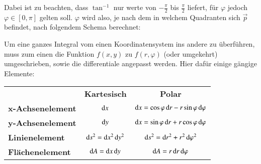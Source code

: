 Dabei ist zu beachten, dass $\tan^{-1}$ nur werte von $-\frac{\pi}{2}$ bis $\frac{\pi}{2}$ liefert, für $\varphi$ jedoch $\varphi \in [0, \pi]$ gelten soll. 
$\varphi$ wird also, je nach dem in welchem Quadranten sich $\vec{p}$ befindet, nach folgendem Schema berechnet:
\begin{center}
\end{center}

Um eine ganzes Integral vom einen Koordinatensystem ins andere zu überführen, muss zum einen die Funktion $ f(x, y) $ zu $ f(r, \varphi) $ (oder umgekehrt) umgeschrieben, sowie die differentiale angepasst werden.
Hier dafür einige gängige Elemente:

\begin{tabular}{l c c}
                         & \bf{Kartesisch}                   & \bf{Polar}                                                       \\
    \bf{x-Achsenelement} & $\mathop{} \! \mathrm{d} x$                         & $\mathop{} \! \mathrm{d} x = \cos \varphi \mathop{} \! \mathrm{d} r - r \sin \varphi \mathop{} \! \mathrm{d} \varphi$  \\
    \bf{y-Achsenelement} & $\mathop{} \! \mathrm{d} y$                         & $\mathop{} \! \mathrm{d} x = \sin \varphi \mathop{} \! \mathrm{d} r + r \cos \varphi \mathop{} \! \mathrm{d} \varphi$  \\
    \bf{Linienelement  } & $\mathop{} \! \mathrm{d} s^2 = \mathop{} \! \mathrm{d} x^2 \mathop{} \! \mathrm{d} y^2$ & $\mathop{} \! \mathrm{d} s^2 = \mathop{} \! \mathrm{d} r^2 + r^2 \mathop{} \! \mathrm{d} \varphi^2$                    \\
    \bf{Flächenelement } & $\mathop{} \! \mathrm{d} A = \mathop{} \! \mathrm{d} x \mathop{} \! \mathrm{d} y$       & $\mathop{} \! \mathrm{d} A = r \mathop{} \! \mathrm{d} r \mathop{} \! \mathrm{d} \varphi$                              \\
\end{tabular}



